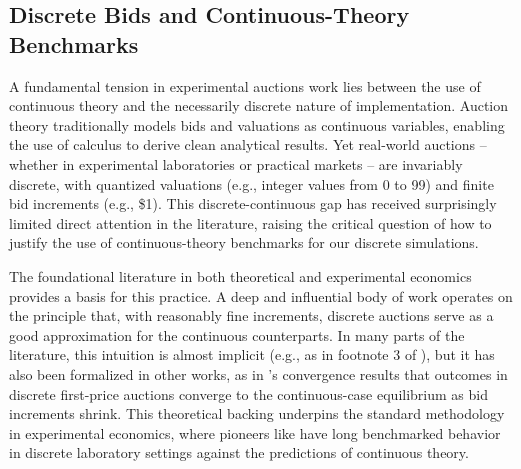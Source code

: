 \documentclass{article} %
\begin{document}
\subsection{Discrete Bids and Continuous-Theory Benchmarks}

A fundamental tension in experimental auctions work lies between the use of continuous theory and the necessarily discrete nature of implementation. Auction theory traditionally models bids and valuations as continuous variables, enabling the use of calculus to derive clean analytical results. Yet  real-world auctions -- whether in experimental laboratories or practical markets -- are invariably discrete, with quantized valuations (e.g., integer values from 0 to 99) and finite bid increments (e.g., \$1). This discrete-continuous gap has received surprisingly limited direct attention in the literature, raising the critical question of how to justify the use of continuous-theory benchmarks for our discrete simulations. 

The foundational literature in both theoretical and experimental economics provides a basis for this practice. A deep and influential body of work operates on the principle that, with reasonably fine increments, discrete auctions serve as a good approximation for the continuous counterparts. In many parts of the literature, this intuition is almost implicit (e.g., as in footnote 3 of \cite{noussair2006behavior}), but it has also been formalized in other works, as in \cite{cai2010note}'s convergence results that outcomes in discrete first-price auctions converge to the continuous-case equilibrium as bid increments shrink. This theoretical backing underpins the standard methodology in experimental economics, where pioneers like \cite{kagel1993independent} have long benchmarked behavior in discrete laboratory settings against the predictions of continuous theory.
\end{document}
